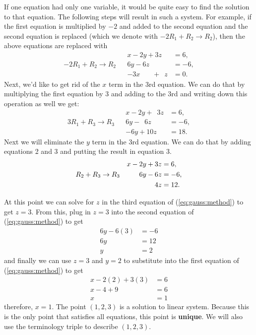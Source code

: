 If one equation had only one variable, it would be quite easy to find the solution to that equation.  The following steps will result in such a system.  For example, if the first equation is multiplied by $-2$ and added to the second equation and the second equation is replaced (which we denote with $-2R_1+R_2 \rightarrow R_2$), then the above equations are replaced with
%
\begin{align*}
&&x -2y + 3z  &= 6, \\
-2R_1+R_2 \rightarrow R_2&&6 y-6z &= -6, \\
&&-3x \phantom{+2y}+\phantom{3} z  &= 0.
\end{align*}
Next, we'd like to get rid of the $x$ term in the 3rd equation.  We can do that by multiplying the first equation by 3 and adding to the 3rd and writing down this operation as well we get:
%
\begin{align*}
&&x -2y + \phantom{1}3z  &= 6, \\
3R_1+R_3 \rightarrow R_3 && 6 y-\phantom{1}6z &= -6, \\
&&-6y+10z & = 18.
\end{align*}
Next we will eliminate the $y$ term in the 3rd equation.  We can do that by adding equations 2 and 3 and putting the result in equation 3.
\begin{align}
&&x -2y + 3z  &= 6, \notag \\
R_2+R_3 \rightarrow R_3 &&  6 y-6z &= -6,  \label{eq:gauss:method} \\
&& 4z & = 12.  \notag
\end{align}

At this point we can solve for $z$ in the third equation of (\ref{eq:gauss:method}) to get $z=3$.  From this, plug in $z=3$ into the second equation of (\ref{eq:gauss:method}) to get
%
\begin{align*}
6y -6(3) & = -6  \\
6y & = 12 \\
y & = 2
\end{align*}
and finally we can use $z=3$ and $y=2$ to substitute into the first equation of (\ref{eq:gauss:method}) to get
%
\begin{align*}
x-2(2)+3(3)& = 6 \\
x-4+9& = 6 \\
x & = 1
\end{align*}
therefore, $x=1$.  The point $(1,2,3)$ is a solution to linear system.    Because this is the only point that satisfies all equations, this point is \textbf{unique}.  We will also use the terminology triple to describe $(1,2,3)$.


